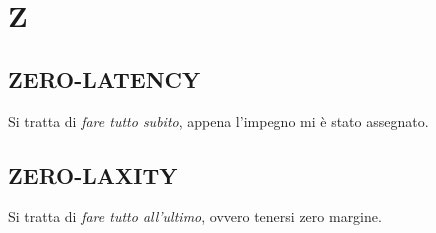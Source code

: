 \newpage
	\section{Z} \label{sec:Z}

		\subsection{ZERO-LATENCY}  \label{zero-latency}
		Si tratta di \textit{fare tutto subito}, appena l'impegno mi è stato assegnato.

		\subsection{ZERO-LAXITY}  \label{zero-laxity}
		Si tratta di \textit{fare tutto all'ultimo}, ovvero tenersi zero margine.
